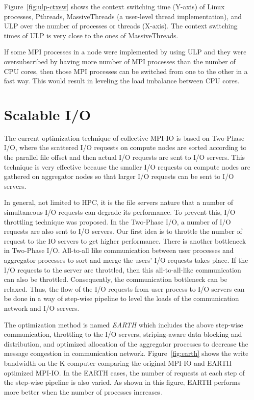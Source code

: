 Figure~\ref{fig:ulp-ctxsw} shows the context switching time (Y-axis)
of Linux processes, Pthreads, MassiveThreads\cite{Nakashima2014} (a
user-level thread implementation), and ULP over the number of
processes or threads (X-axis). The context switching times of ULP is
very close to the ones of MassiveThreads.

If some MPI processes in a node were implemented by using ULP and they
were oversubscribed by having more number of MPI processes than the
number of CPU cores, then those MPI processes can be switched from one
to the other in a fast way. This would result in leveling the load
imbalance between CPU cores. 

\section{Scalable I/O}

The current optimization technique of collective MPI-IO\cite{romio} is
based on Two-Phase I/O\cite{two-phase}, where the scattered I/O
requests on compute nodes are 
sorted according to the parallel file offset and then actual I/O
requests are sent to I/O servers. This technique is very effective
because the smaller I/O requests on compute nodes are gathered on
aggregator nodes so that larger I/O requests can be sent to I/O
servers. 

In general, not limited to HPC, it is the file servers nature that a
number of simultaneous I/O requests can degrade its performance. To
prevent this, I/O throttling technique was proposed. In the Two-Phase
I/O, a number of I/O requests are also sent to I/O servers. Our first
idea is to throttle the number of request to the IO servers to get
higher performance. There is another bottleneck in Two-Phase
I/O. All-to-all like communication between user processes and
aggregator processes to sort and merge the users' I/O requests takes
place. If the I/O requests to the server are throttled, then this
all-to-all-like communication can also be throttled. Consequently, the
communication bottleneck can be relaxed. Thus, the flow  
of the I/O requests from user process to I/O servers can be done in a
way of step-wise pipeline to level the loads of the communication
network and I/O servers.

The optimization method is named {\em EARTH} which includes the above
step-wise communication, throttling to the I/O servers,
striping-aware data blocking and distribution, and 
optimized allocation of the aggregator processes to decrease the message
congestion in communication
network\cite{tsujita:WS_EuroMPI2014,tsujita:hpcasia18}. 
Figure~\ref{fig:earth} shows the 
write bandwidth on the K computer\cite{k-computer} comparing the
original MPI-IO and 
EARTH optimized MPI-IO. In the EARTH cases, the number of requests at
each step of the step-wise pipeline is also varied. As shown in this
figure, EARTH performs more better when the number of processes
increases. 

